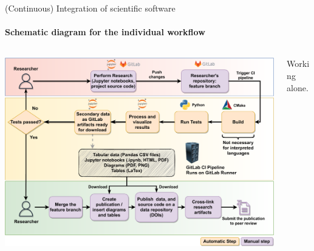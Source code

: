 \begin{frame}{(Continuous) Integration of scientific software} 
	\framesubtitle{Schematic diagram for the individual workflow}
        \vfill

        \centering

        \begin{columns}
            \begin{column}[c]{0.55\textwidth}
                \includegraphics[width=\columnwidth]{figures/ZINF-CI-diagram-individual.pdf}
            \end{column}
            \begin{column}[c]{0.20\textwidth}
                Working alone. 
            \end{column}
        \end{columns}
\end{frame}

